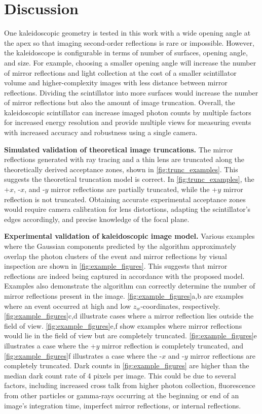 \section{Discussion}

One kaleidoscopic geometry is tested in this work with a wide opening angle at the 
apex so that imaging second-order reflections is rare or impossible. 
However, the kaleidoscope is configurable in terms of number of surfaces, opening 
angle, and size.
For example, choosing a smaller opening angle will increase the number of mirror 
reflections and light collection at the cost of a smaller scintillator volume and 
higher-complexity images with less distance between mirror reflections.
Dividing the scintillator into more surfaces would increase the number of mirror 
reflections but also the amount of image truncation.
Overall, the kaleidoscopic scintillator can increase imaged photon counts by 
multiple factors for increased energy resolution and provide multiple views for 
measuring events with increased accuracy and robustness using a single camera.

\noindent
\textbf{Simulated validation of theoretical image truncations.}
The mirror reflections generated with ray tracing and a thin lens are truncated 
along the theoretically derived acceptance zones, shown in \cref{fig:trunc_examples}. 
This suggests the theoretical truncation model is correct.
In \cref{fig:trunc_examples}, the +$x$, -$x$, and -$y$ mirror reflections are 
partially truncated, while the +$y$ mirror reflection is not truncated.
Obtaining accurate experimental acceptance zones would require camera 
calibration for lens distortions, adapting the scintillator's edges accordingly, 
and precise knowledge of the focal plane.

\noindent
\textbf{Experimental validation of kaleidoscopic image model.}
Various examples where the Gaussian components predicted by the 
algorithm approximately overlap the photon clusters of the event and mirror 
reflections by visual inspection are shown in \cref{fig:example_figures}.
This suggests that mirror reflections are indeed being captured in accordance with 
the proposed model.
Examples also demonstrate the algorithm can correctly determine the number of 
mirror reflections present in the image.
\cref{fig:example_figures}a,b are examples where an event occurred at high and 
low $z_w$-coordinates, respectively.
\cref{fig:example_figures}c,d illustrate cases where a mirror reflection lies 
outside the field of view. 
\cref{fig:example_figures}e,f show examples where mirror reflections would lie in 
the field of view but are completely truncated.
\cref{fig:example_figures}e illustrates a case where the +$y$ mirror reflection is 
completely truncated, and \cref{fig:example_figures}f illustrates a case where the 
-$x$ and -$y$ mirror reflections are completely truncated.
Dark counts in \cref{fig:example_figures} are higher than the median dark count 
rate of 4 pixels per image.
This could be due to several factors, including increased cross talk from higher 
photon collection, fluorescence from other particles or gamma-rays occurring at 
the beginning or end of an image's integration time, imperfect mirror reflections, 
or internal reflections.

